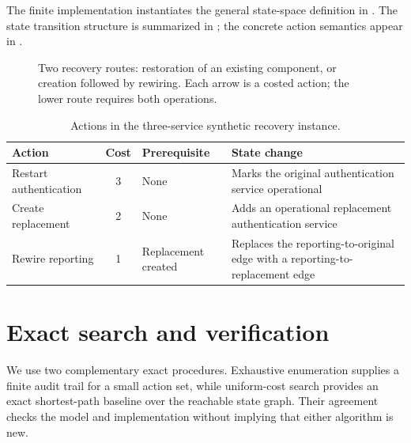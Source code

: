 \documentclass[11pt,a4paper]{article}
\begin{document}
The finite implementation instantiates the general state-space definition in . The state transition structure is summarized in ; the concrete action semantics appear in .
\begin{figure}[H]\centering
{}
\caption{Two recovery routes: restoration of an existing component, or creation followed by rewiring. Each arrow is a costed action; the lower route requires both operations.}\label{fig:concept}
\end{figure}

\begin{table}[H]\centering\caption{Actions in the three-service synthetic recovery instance.}\label{tab:actions}
\begin{tabularx}{\linewidth}{@{}lclX@{}}\toprule
Action & Cost & Prerequisite & State change\\\midrule
Restart authentication & 3 & None & Marks the original authentication service operational\\
Create replacement & 2 & None & Adds an operational replacement authentication service\\
Rewire reporting & 1 & Replacement created & Replaces the reporting-to-original edge with a reporting-to-replacement edge\\\bottomrule
\end{tabularx}\end{table}

\section{Exact search and verification}
We use two complementary exact procedures. Exhaustive enumeration supplies a finite audit trail for a small action set, while uniform-cost search provides an exact shortest-path baseline over the reachable state graph. Their agreement checks the model and implementation without implying that either algorithm is new.
\end{document}
